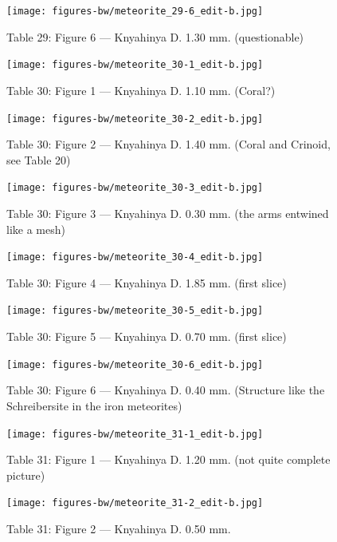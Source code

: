 \documentclass[a4paper, 12pt, oneside]{article}
\begin{document}
\clearpage
\begin{figure}[t]
\texttt{[image: figures-bw/meteorite\_29-6\_edit-b.jpg]}
\caption{Table 29: Figure 6 --- Knyahinya D. 1.30 mm. (questionable)}
\centering
\end{figure}
\clearpage
{}
\begin{figure}[t]
\texttt{[image: figures-bw/meteorite\_30-1\_edit-b.jpg]}
\caption{Table 30: Figure 1 --- Knyahinya D. 1.10 mm. (Coral?)}
\centering
\end{figure}
\clearpage
\begin{figure}[t]
\texttt{[image: figures-bw/meteorite\_30-2\_edit-b.jpg]}
\caption{Table 30: Figure 2 --- Knyahinya D. 1.40 mm. (Coral and Crinoid, see Table 20)}
\centering
\end{figure}
\clearpage
\begin{figure}[t]
\texttt{[image: figures-bw/meteorite\_30-3\_edit-b.jpg]}
\caption{Table 30: Figure 3 --- Knyahinya D. 0.30 mm. (the arms entwined like a mesh)}
\centering
\end{figure}
\clearpage
\begin{figure}[t]
\texttt{[image: figures-bw/meteorite\_30-4\_edit-b.jpg]}
\caption{Table 30: Figure 4 --- Knyahinya D. 1.85 mm. (first slice)}
\centering
\end{figure}
\clearpage
\begin{figure}[t]
\texttt{[image: figures-bw/meteorite\_30-5\_edit-b.jpg]}
\caption{Table 30: Figure 5 --- Knyahinya D. 0.70 mm. (first slice)}
\centering
\end{figure}
\clearpage
\begin{figure}[t]
\texttt{[image: figures-bw/meteorite\_30-6\_edit-b.jpg]}
\caption{Table 30: Figure 6 --- Knyahinya D. 0.40 mm. (Structure like the Schreibersite in the iron meteorites)}
\centering
\end{figure}
\clearpage
{}
\begin{figure}[t]
\texttt{[image: figures-bw/meteorite\_31-1\_edit-b.jpg]}
\caption{Table 31: Figure 1 --- Knyahinya D. 1.20 mm. (not quite complete picture)}
\centering
\end{figure}
\clearpage
\begin{figure}[t]
\texttt{[image: figures-bw/meteorite\_31-2\_edit-b.jpg]}
\caption{Table 31: Figure 2 --- Knyahinya D. 0.50 mm.}
\centering
\end{figure}
\end{document}
